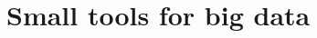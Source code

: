 \documentclass[10pt]{beamer}
\begin{document}


\section{Small tools for big data}
\subsection{}
\end{document}
